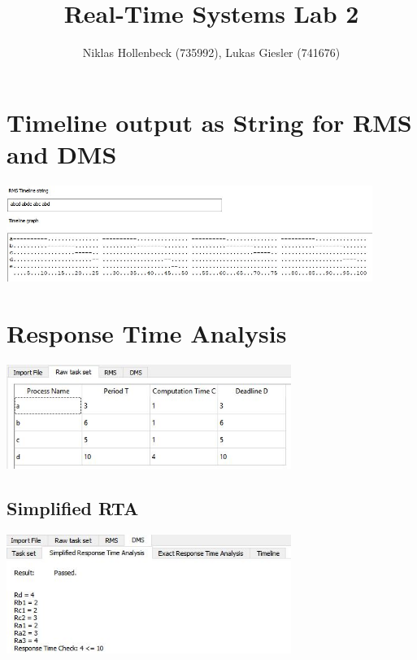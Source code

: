 \documentclass[a4paper]{article}
\title{Real-Time Systems Lab 2}
\author{Niklas Hollenbeck (735992), Lukas Giesler (741676)}
\date{}
\begin{document}
\maketitle

\section{Timeline output as String for RMS and DMS}
\begin{center}
	\includegraphics[width=450px]{img1.JPG}
\end{center}

\section{Response Time Analysis}
\begin{center}
	\includegraphics[width=350px]{img4.JPG}
\end{center}

\subsection{Simplified RTA}
\begin{center}
	\includegraphics[width=350px]{img2.JPG}
\end{center}
\end{document}
